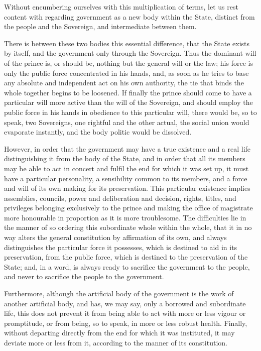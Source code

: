 \documentclass[12pt]{report}
\begin{document}
Without encumbering ourselves with this multiplication of terms, let us rest content with regarding government as a new body within the State, distinct from the people and the Sovereign, and intermediate between them.

There is between these two bodies this essential difference, that the State exists by itself, and the government only through the Sovereign. Thus the dominant will of the prince is, or should be, nothing but the general will or the law; his force is only the public force concentrated in his hands, and, as soon as he tries to base any absolute and independent act on his own authority, the tie that binds the whole together begins to be loosened. If finally the prince should come to have a particular will more active than the will of the Sovereign, and should employ the public force in his hands in obedience to this particular will, there would be, so to speak, two Sovereigns, one rightful and the other actual, the social union would evaporate instantly, and the body politic would be dissolved.

However, in order that the government may have a true existence and a real life distinguishing it from the body of the State, and in order that all its members may be able to act in concert and fulfil the end for which it was set up, it must have a particular personality, a sensibility common to its members, and a force and will of its own making for its preservation. This particular existence implies assemblies, councils, power and deliberation and decision, rights, titles, and privileges belonging exclusively to the prince and making the office of magistrate more honourable in proportion as it is more troublesome. The difficulties lie in the manner of so ordering this subordinate whole within the whole, that it in no way alters the general constitution by affirmation of its own, and always distinguishes the particular force it possesses, which is destined to aid in its preservation, from the public force, which is destined to the preservation of the State; and, in a word, is always ready to sacrifice the government to the people, and never to sacrifice the people to the government.

Furthermore, although the artificial body of the government is the work of another artificial body, and has, we may say, only a borrowed and subordinate life, this does not prevent it from being able to act with more or less vigour or promptitude, or from being, so to speak, in more or less robust health. Finally, without departing directly from the end for which it was instituted, it may deviate more or less from it, according to the manner of its constitution.
\end{document}
